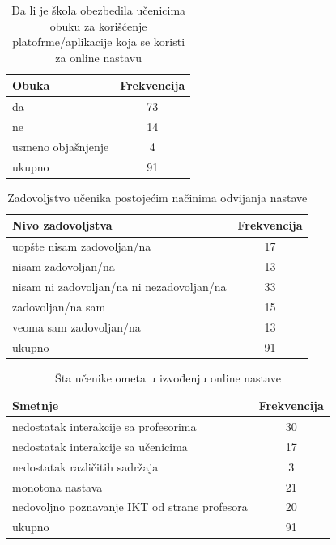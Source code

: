 \documentclass{article}
\begin{document}
\begin{table}[h!]
\centering
{}
  \begin{tabular}{ | l | c |}
    \hline
    Obuka & Frekvencija \\ \hline
    da & 73  \\ \hline 
    ne & 14  \\ \hline
    usmeno objašnjenje & 4 \\ \hline
    ukupno &  91 \\
    \hline
  \end{tabular}
  \caption{Da li je škola obezbedila učenicima obuku za korišćenje platofrme/aplikacije koja se koristi za online nastavu}
  \label{tab:tabela3}
\end{table}

\begin{table}[h!]
\centering
{}
  \begin{tabular}{ | l | c |}
    \hline
    Nivo zadovoljstva & Frekvencija \\ \hline
    uopšte nisam zadovoljan/na & 17  \\ \hline 
    nisam zadovoljan/na & 13  \\ \hline
    nisam ni zadovoljan/na ni nezadovoljan/na & 33 \\ \hline
    zadovoljan/na sam &  15 \\ \hline
    veoma sam zadovoljan/na & 13 \\ \hline
    ukupno & 91 \\
    \hline
  \end{tabular}
  \caption{Zadovoljstvo učenika postojećim načinima odvijanja nastave}
  \label{tab:tabela4}
\end{table}

\begin{table}[h!]
\centering
{}
  \begin{tabular}{ | l | c |}
    \hline
    Smetnje & Frekvencija \\ \hline
    nedostatak interakcije sa profesorima & 30  \\ \hline 
    nedostatak interakcije sa učenicima & 17  \\ \hline
    nedostatak različitih sadržaja & 3 \\ \hline
    monotona nastava & 21 \\ \hline
    nedovoljno poznavanje IKT od strane profesora & 20 \\ \hline
    ukupno & 91 \\
    \hline
  \end{tabular}
  \caption{Šta učenike ometa u izvođenju online nastave}
  \label{tab:tabela5}
\end{table}
\end{document}
